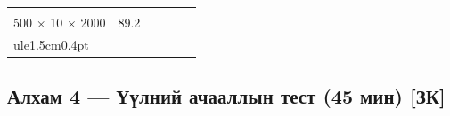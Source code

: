 \begin{longtable}[]{@{}llllll@{}}
\begin{minipage}[t]{0.14\columnwidth}
\strut
\end{minipage} & \begin{minipage}[t]{0.14\columnwidth}\raggedright
\strut
\end{minipage} & \begin{minipage}[t]{0.14\columnwidth}\raggedright
\strut
\end{minipage}\tabularnewline
\begin{minipage}[t]{0.14\columnwidth}\raggedright
500 × 10 × 2000\strut
\end{minipage} & \begin{minipage}[t]{0.14\columnwidth}\raggedright
89.2\strut
\end{minipage} & \begin{minipage}[t]{0.14\columnwidth}\raggedright
\strut
\end{minipage} & \begin{minipage}[t]{0.14\columnwidth}\raggedright
\strut
\end{minipage} & \begin{minipage}[t]{0.14\columnwidth}\raggedright
\strut
\end{minipage} & \begin{minipage}[t]{0.14\columnwidth}\raggedright
\strut
\end{minipage}\tabularnewline
\begin{minipage}[t]{0.14\columnwidth}\raggedright
ule{1.5cm}{0.4pt}\strut
\end{minipage} & \begin{minipage}[t]{0.14\columnwidth}\raggedright
\strut
\end{minipage} & \begin{minipage}[t]{0.14\columnwidth}\raggedright
\strut
\end{minipage} & \begin{minipage}[t]{0.14\columnwidth}\raggedright
\strut
\end{minipage} & \begin{minipage}[t]{0.14\columnwidth}\raggedright
\strut
\end{minipage} & \begin{minipage}[t]{0.14\columnwidth}\raggedright
\strut
\end{minipage}\tabularnewline
\bottomrule
\end{longtable}\endgroup

\hypertarget{ux430ux43bux445ux430ux43c-4-ux4afux4afux43bux43dux438ux439-ux430ux447ux430ux430ux43bux43bux44bux43d-ux442ux435ux441ux442-45-ux43cux438ux43d-ux437ux43a}{%
\subsection{Алхам 4 --- Үүлний ачааллын тест (45 мин) {[}ЗК{]}}\label{ux430ux43bux445ux430ux43c-4-ux4afux4afux43bux43dux438ux439-ux430ux447ux430ux430ux43bux43bux44bux43d-ux442ux435ux441ux442-45-ux43cux438ux43d-ux437ux43a}}

